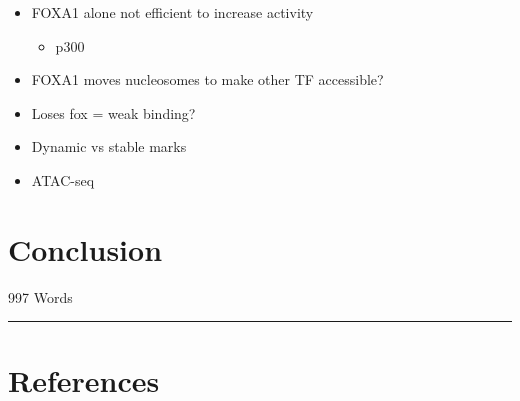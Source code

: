 \documentclass[
  12pt,
]{article}
\providecommand{\tightlist}{%
  \setlength{\itemsep}{0pt}\setlength{\parskip}{0pt}}
\begin{document}
\begin{itemize}
\item
  FOXA1 alone not efficient to increase activity

  \begin{itemize}
  \tightlist
  \item
    p300
  \end{itemize}
\item
  FOXA1 moves nucleosomes to make other TF accessible?
\item
  Loses fox = weak binding?
\item
  Dynamic vs stable marks
\item
  ATAC-seq
\end{itemize}

\hypertarget{conclusion}{%
\section{Conclusion}\label{conclusion}}

\begin{flushright}
997 Words
\end{flushright}

\begin{center}\rule{0.5\linewidth}{0.5pt}\end{center}

\hypertarget{references}{%
\section*{References}\label{references}}
\end{document}
